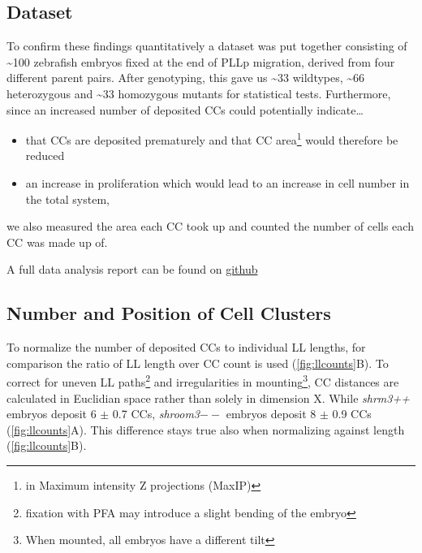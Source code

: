 \documentclass[11pt,singlespacinge,twoside]{reedthesis} %
\providecommand{\tightlist}{%
  \setlength{\itemsep}{0pt}\setlength{\parskip}{0pt}}
\begin{document}
\hypertarget{dataset}{%
\subsection{Dataset}\label{dataset}}

To confirm these findings quantitatively a dataset was put together consisting of \textasciitilde{}100 zebrafish embryos fixed at the end of PLLp migration, derived from four different parent pairs. After genotyping, this gave us \textasciitilde{}33 wildtypes, \textasciitilde{}66 heterozygous and \textasciitilde{}33 homozygous mutants for statistical tests. Furthermore, since an increased number of deposited CCs could potentially indicate\ldots{}
\begin{itemize}
\tightlist
\item
  that CCs are deposited prematurely and that CC area\footnote{in Maximum intensity Z projections (MaxIP)} would therefore be reduced
\item
  an increase in proliferation which would lead to an increase in cell number in the total system,
\end{itemize}
we also measured the area each CC took up and counted the number of cells each CC was made up of.

A full data analysis report can be found on \href{https://github.com/KleinhansDa/reports/blob/master/b7a875fc1ea228b9061041b7cec4bd3c52ab3ce3/clusters_eom.html}{github}

\hypertarget{res-ccounts}{%
\subsection{Number and Position of Cell Clusters}\label{res-ccounts}}

To normalize the number of deposited CCs to individual LL lengths, for comparison the ratio of LL length over CC count is used (\ref{fig:llcounts}B). To correct for uneven LL paths\footnote{fixation with PFA may introduce a slight bending of the embryo} and irregularities in mounting\footnote{When mounted, all embryos have a different tilt}, CC distances are calculated in Euclidian space rather than solely in dimension X. While \emph{shrm3++} embryos deposit 6 \(\pm\) 0.7 CCs, \emph{shroom3}\(--\) embryos deposit 8 \(\pm\) 0.9 CCs (\ref{fig:llcounts}A). This difference stays true also when normalizing against length (\ref{fig:llcounts}B).
\end{document}
